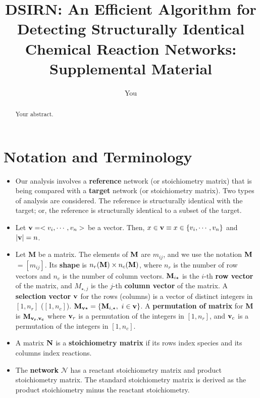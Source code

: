 \documentclass{article}
\title{DSIRN: An Efficient Algorithm for {\bf D}etecting {\bf S}tructurally {\bf I}dentical Chemical {\bf R}eaction {\bf N}etworks: Supplemental Material}
\author{You}
\newcommand{\mat}[1]{${\bf #1}$} %
\newcommand{\net}[1]{$\mathcal{#1}$} %
\newcommand{\mrow}[2]{${\bf #1}_{#2 \star}$}  %
\begin{document}
\maketitle

\begin{abstract}
Your abstract.
\end{abstract}

\section{Notation and Terminology}
\begin{itemize}

     \item Our analysis involves a {\bf reference} network (or stoichiometry matrix) that is being compared with a {\bf target} network (or stoichiometry matrix). Two types of analysis are considered. The reference is structurally identical with the target; or, the reference is structurally identical to a subset of the target.

    \item Let ${\bf v} = <v_i, \cdots, v_n>$ be a vector. 
    Then, $x \in {\bf v} \equiv x \in \{ v_i, \cdots, v_n \}$
    and $| {\bf v} | = n$.
    
    \item Let {\bf M} be a matrix. The elements of \mat{M} are $m_{ij}$, and we use the notation \mat{M}$= \left[ m_{ij} \right]$.
        Its {\bf shape} is $n_r({\bf M}) \times n_c ({\bf M})$, where
        $n_r$ is the number of row vectors and $n_c$ is the number of column vectors.
        \mrow{M}{i} is the $i$-th {\bf row vector} of the matrix, and 
        $M_{\star,j}$ is the $j$-th {\bf column vector} of the matrix.
        A {\bf selection vector} ${\bf v}$ for the rows (columns) is a vector of distinct integers in $[1, n_r]$ ($[1, n_c]$).
        ${\bf M_{{\bf v} \star}} = \{ {\bf M}_{i,\star}, ~ i\in {\bf v} \}$.
        A {\bf permutation of matrix} for {\bf M} is
        ${\bf M_{{\bf v}_r, {\bf v}_c}}$ where
        ${\bf v}_r$ is a permutation of the integers in
        $[1, n_r]$, and ${\bf v}_c$ is a permutation of the integers in $[1, n_c]$.
        
    \item A matrix ${\bf N}$ is a {\bf stoichiometry matrix} if its rows index species and its
    columns index reactions.

    \item The {\bf network} \net{N} has a reactant stoichiometry matrix and product stoichiometry matrix. The standard stoichiometry matrix is derived as the product stoichiometry minus the reactant stoichiometry.
    

\end{itemize}
\end{document}
